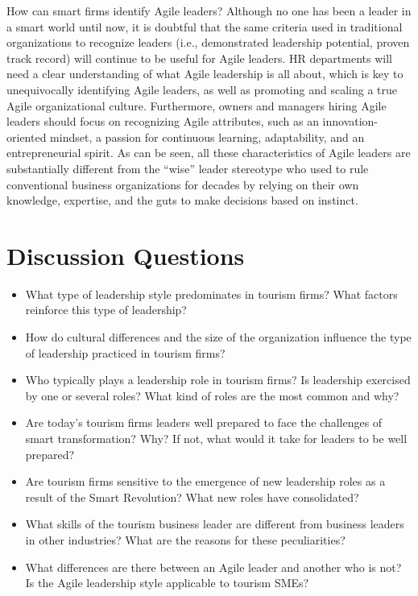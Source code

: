 \documentclass[
  letterpaper,
  DIV=11,
  numbers=noendperiod]{scrreprt}
\begin{document}
How can smart firms identify Agile leaders? Although no one has been a
leader in a smart world until now, it is doubtful that the same criteria
used in traditional organizations to recognize leaders (i.e.,
demonstrated leadership potential, proven track record) will continue to
be useful for Agile leaders. HR departments will need a clear
understanding of what Agile leadership is all about, which is key to
unequivocally identifying Agile leaders, as well as promoting and
scaling a true Agile organizational culture. Furthermore, owners and
managers hiring Agile leaders should focus on recognizing Agile
attributes, such as an innovation-oriented mindset, a passion for
continuous learning, adaptability, and an entrepreneurial spirit. As can
be seen, all these characteristics of Agile leaders are substantially
different from the ``wise'' leader stereotype who used to rule
conventional business organizations for decades by relying on their own
knowledge, expertise, and the guts to make decisions based on instinct.

\hypertarget{discussion-questions-15}{%
\section{Discussion Questions}\label{discussion-questions-15}}

\begin{itemize}
\item
  What type of leadership style predominates in tourism firms? What
  factors reinforce this type of leadership?
\item
  How do cultural differences and the size of the organization influence
  the type of leadership practiced in tourism firms?
\item
  Who typically plays a leadership role in tourism firms? Is leadership
  exercised by one or several roles? What kind of roles are the most
  common and why?
\item
  Are today's tourism firms leaders well prepared to face the challenges
  of smart transformation? Why? If not, what would it take for leaders
  to be well prepared?
\item
  Are tourism firms sensitive to the emergence of new leadership roles
  as a result of the Smart Revolution? What new roles have consolidated?
\item
  What skills of the tourism business leader are different from business
  leaders in other industries? What are the reasons for these
  peculiarities?
\item
  What differences are there between an Agile leader and another who is
  not? Is the Agile leadership style applicable to tourism SMEs?
\end{itemize}
\end{document}
